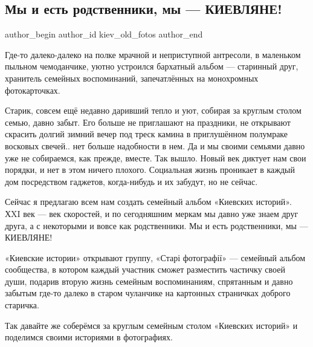  
 
 
 
 
 
\subsection{Мы и есть родственники, мы — КИЕВЛЯНЕ!}
\label{sec:12_04_2021.fb.kiev_old_fotos.1.my_kievljane_fotoalbom}
\ifcmt
 author_begin
   author_id kiev_old_fotos
 author_end
\fi

Где-то далеко-далеко на полке мрачной и неприступной антресоли, в маленьком
пыльном чемоданчике, уютно устроился бархатный альбом — старинный друг,
хранитель семейных воспоминаний, запечатлённых на монохромных фотокарточках.

Старик, совсем ещё недавно даривший тепло и уют, собирая за круглым столом
семью, давно забыт. Его больше не приглашают на праздники, не открывают
скрасить долгий зимний вечер под треск камина в приглушённом полумраке восковых
свечей.. нет больше надобности в нем. Да и мы своими семьями давно уже не
собираемся, как прежде, вместе. Так вышло. Новый век диктует нам свои порядки,
и нет в этом ничего плохого. Социальная жизнь проникает в каждый дом
посредством гаджетов, когда-нибудь и их забудут, но не сейчас. 

Сейчас я предлагаю всем нам создать семейный альбом «Киевских историй». ХXI век
— век скоростей, и по сегодняшним меркам мы давно уже знаем друг друга, а с
некоторыми и вовсе как родственники. Мы и есть родственники, мы — КИЕВЛЯНЕ!

«Киевские истории» открывают группу, «Старі фотографії» — семейный альбом
сообщества, в котором каждый участник сможет разместить частичку своей души,
подарив вторую жизнь семейным воспоминаниям, спрятанным и давно забытым где-то
далеко в старом чуланчике на картонных страничках доброго старичка.

Так давайте же соберёмся за круглым семейным столом «Киевских историй» и
поделимся своими историями в фотографиях.

